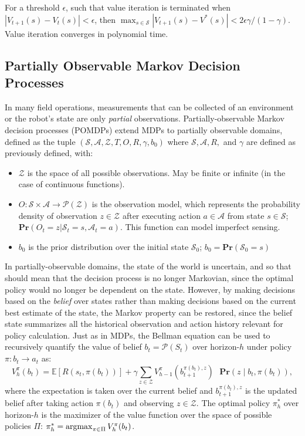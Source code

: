 For a threshold $\epsilon$, such that value iteration is terminated when $|V_{t+1}(s) - V_t(s)| < \epsilon$, then $\max_{s \in \mathcal{S}} | V_{t+1}(s) - V^*(s) | < 2\epsilon\gamma/(1-\gamma)$.
Value iteration converges in polynomial time.

\subsection{Partially Observable Markov Decision Processes}
In many field operations, measurements that can be collected of an environment or the robot's state are only \emph{partial} observations.
Partially-observable Markov decision processes \autocite{kaelbling1998planning} (POMDPs) extend MDPs to partially observable domains, defined as the tuple $(\mathcal{S}, \mathcal{A}, \mathcal{Z}, T, O, R, \gamma, b_0)$ where $\mathcal{S}, \mathcal{A}, R,$ and $\gamma$ are defined as previously defined, with:

\begin{itemize}
	\item $\mathcal{Z}$ is the space of all possible observations. May be finite or infinite (in the case of continuous functions).
	\item $O : \mathcal{S} \times \mathcal{A} \to \mathcal{P}(\mathcal{Z})$ is the observation model, which represents the probability density of observation $z \in \mathcal{Z}$ after executing action $a \in \mathcal{A}$ from state $s \in \mathcal{S}$; $\mathbf{Pr}(O_t = z | \mathcal{S}_t = s, \mathcal{A}_t = a)$. This function can model imperfect sensing.
	\item $b_0$ is the prior distribution over the initial state $\mathcal{S}_0$; $b_0 = \textbf{Pr}(\mathcal{S}_0 = s)$
\end{itemize}

In partially-observable domains, the state of the world is uncertain, and so that should mean that the decision process is no longer Markovian, since the optimal policy would no longer be dependent on the state.
However, by making decisions based on the \emph{belief} over states rather than making decisions based on the current best estimate of the state, the Markov property can be restored, since the belief state summarizes all the historical observation and action history relevant for policy calculation.
Just as in MDPs, the Bellman equation can be used to recursively quantify the value of belief $b_t = \mathcal{P}(S_t)$ over horizon-$h$ under policy $\pi: b_t \to a_t$ as: 
\begin{equation}
  V^{\pi}_h(b_t) = \mathbb{E}[R(s_t, \pi(b_t))] + \gamma \sum_{z \in \mathcal{Z}} V^{\pi}_{h-1}(b^{\pi(b_t), z}_{t+1}) \text{ }\textbf{Pr}(z \mid b_t, \pi(b_t)),
  \label{eq:pomdp_value}
\end{equation}
\noindent where the expectation is taken over the current belief and $b^{\pi(b_t), z}_{t+1}$ is the updated belief after taking action $\pi(b_t)$ and observing $z \in \mathcal{Z}$.
The optimal policy $\pi_h^*$ over horizon-$h$ is the maximizer of the value function over the space of possible policies $\Pi$: $\pi_h^* = \mathop\mathrm{arg max}_{\pi \in \Pi} V^{\pi}_h(b_t)$.


